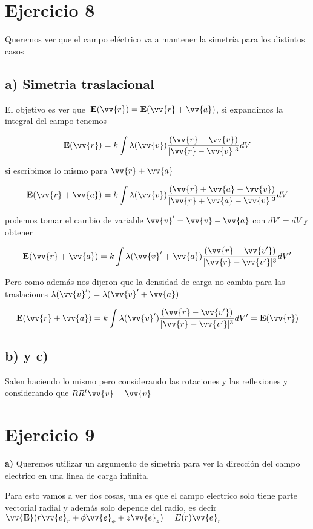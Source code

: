 \documentclass[leqno, 12pt, twoside, letterpaper]{book}
\def\efield{\textbf{E}}
\begin{document}
\section*{Ejercicio 8}

Queremos ver que el campo eléctrico va a mantener la simetría para los distintos casos

\subsection*{a) Simetria traslacional}

El objetivo es ver que  $\,\efield(\vv{r}) = \efield(\vv{r} + \vv{a})$, si expandimos la integral del campo tenemos

\[ \efield(\vv{r}) = k \int \lambda(\vv{v}) \dfrac{(\vv{r} - \vv{v})}{|\vv{r} - \vv{v}|^3} dV \]

\noindent si escribimos lo mismo para $\vv{r} + \vv{a}$ 


\[ \efield(\vv{r} + \vv{a}) = k \int \lambda(\vv{v}) \dfrac{(\vv{r} + \vv{a} - \vv{v})}{|\vv{r} + \vv{a} - \vv{v}|^3} dV \]

\noindent podemos tomar el cambio de variable $\vv{v}' = \vv{v} - \vv{a} $ con $dV' =  dV $ y obtener 


\[ \efield(\vv{r} + \vv{a}) = k \int \lambda(\vv{v}' + \vv{a}) \dfrac{(\vv{r} - \vv{v'})}{|\vv{r} - \vv{v'}|^3} dV' \]

\noindent Pero como además nos dijeron que la densidad de carga no cambia para las traslaciones $\lambda(\vv{v}') = \lambda(\vv{v}'+\vv{a})$

$$ \efield(\vv{r} + \vv{a}) = k \int \lambda(\vv{v}') \dfrac{(\vv{r} - \vv{v'})}{|\vv{r} - \vv{v'}|^3} dV' =  \efield(\vv{r})
$$

\subsection*{b) y c)} 

Salen haciendo lo mismo pero considerando las rotaciones y las reflexiones y considerando que $ R R^t \vv{v} = \vv{v}$

\section*{Ejercicio 9}

\textbf{a)} Queremos utilizar un argumento de simetría para ver la dirección del campo electrico en una linea de carga infinita.

Para esto vamos a ver dos cosas, una es que el campo electrico solo tiene parte vectorial radial y además solo depende del radio, es decir $\vv{\efield}(r\vv{e}_r + \phi\vv{e}_{\phi} + z\vv{e}_z ) = E(r) \vv{e}_r$ 
\end{document}
